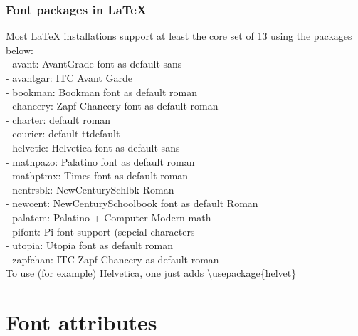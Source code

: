 \documentclass{beamer}
\begin{document}
\begin{frame}[fragile]
\frametitle{Font packages in \LaTeX{}}
\vspace{-0.4cm}
\footnotesize{Most \LaTeX{} installations support at least the core set of 13 using the packages below:}\\[5 pt]
\scriptsize{- avant: AvantGrade font as default sans\\
- avantgar: ITC Avant Garde\\
- bookman: Bookman font as default roman\\
- chancery: Zapf Chancery font as default roman\\
- charter: default roman\\
- courier: default ttdefault\\
- helvetic: Helvetica font as default sans\\
- mathpazo: Palatino font as default roman\\
- mathptmx: Times font as default roman\\
- ncntrsbk: NewCenturySchlbk-Roman\\
- newcent: NewCenturySchoolbook font as default Roman\\
- palatcm: Palatino + Computer Modern math\\
- pifont: Pi font support (sepcial characters\\
- utopia: Utopia font as default roman\\
- zapfchan: ITC Zapf Chancery as default roman}\\
\footnotesize{To use (for example) Helvetica, one just adds \tiny{\textbackslash usepackage\{helvet\}}}
\end{frame}

\section{Font attributes}
\end{document}
